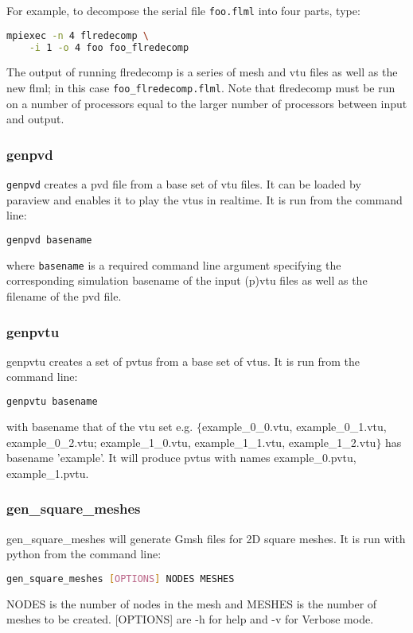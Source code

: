 For example, to decompose the serial file \lstinline+foo.flml+
into four parts, type:

\begin{lstlisting}[language=bash]
mpiexec -n 4 flredecomp \
    -i 1 -o 4 foo foo_flredecomp
\end{lstlisting}

The output of running flredecomp is a series of mesh and vtu files as well
as the new flml; in this case \lstinline+foo_flredecomp.flml+.
Note that flredecomp must be run on a number of processors equal to the larger number of processors between input and output.


\subsubsection{genpvd}
\label{sec:genpvd}
\texttt{genpvd} creates a pvd file from a base set of vtu files. It can be loaded by paraview and enables it to play the vtus in realtime. It is run from the command line:
\begin{lstlisting}[language = Bash]
genpvd basename
\end{lstlisting}
where \texttt{basename} is a required command line argument specifying the corresponding simulation basename of the input (p)vtu files as well as the filename of the pvd file.


\subsubsection{genpvtu}
\label{sec:genpvtu}
genpvtu creates a set of pvtus from a base set of vtus. It is run from the command line:
\begin{lstlisting}[language = Bash]
genpvtu basename
\end{lstlisting}
with basename that of the vtu set e.g. $\{$example\_0\_0.vtu, example\_0\_1.vtu, example\_0\_2.vtu; example\_1\_0.vtu, example\_1\_1.vtu, example\_1\_2.vtu$\}$ has basename 'example'. It will produce pvtus with names example\_0.pvtu, example\_1.pvtu.


\subsubsection{gen\_square\_meshes}
\label{sec:gen_square_meshes}
gen\_square\_meshes will generate Gmsh files for 2D square meshes. It is run with python from the command line:
\begin{lstlisting}[language = Bash]
gen_square_meshes [OPTIONS] NODES MESHES
\end{lstlisting}
NODES is the number of nodes in the mesh and MESHES is the number of meshes to be created. [OPTIONS] are -h for help and -v for Verbose mode.

